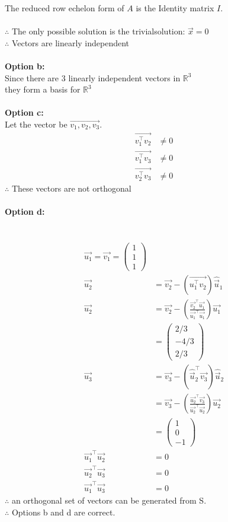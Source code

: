 \documentclass[journal]{IEEEtran}
\begin{document}
The reduced row echelon form of $A$ is the Identity matrix $I$.\\\\
$\therefore$ The only possible solution is the trivialsolution:
$\vec{x}=0$\\
$\therefore$ Vectors are linearly independent\\\\
\textbf{Option b:}\\
Since there are 3 linearly independent vectors in $\mathbb{R}^3$ \\they form a basis for $\mathbb{R}^3$\\\\
\textbf{Option c:}\\
    Let the vector be $\vec{v_1, v_2, v_3}$.
    \begin{align}
    \vec{v_1^\top v_2} &\neq 0 \\
    \vec{v_1^\top v_3 }&\neq 0 \\
    \vec{v_2^\top v_3 }&\neq 0
    \end{align}
    $\therefore$ These vectors are not orthogonal\\\\
\textbf{Option d:}\\
 \\
\\
\begin{align}\vec{u_1} = \vec{v_1} = \begin{pmatrix} 1 \\ 1\\1 \end{pmatrix}\\
\vec{u_2} &= \vec{v_2} - (\vec{u_1^\top v_2}) \hat{\vec{u}}_1 \\
\vec{u_2} &= \vec{v_2} - \left(\frac{\vec{v_2}^\top \vec{u_1}}{\vec{u_1}^\top \vec{u_1}} \right) \vec{u_1}\\ &= \begin{pmatrix} 2/3 \\ -4/3 \\ 2/3 \end{pmatrix} \\
\vec{u_3} &= \vec{v_3} - (\hat{\vec{u}}_2^\top \vec{v_3}) \hat{\vec{u}}_2 \\&= \vec{v_3} - \left( \frac{\vec{u_2}^\top \vec{v_3}}{\vec{u_2}^\top \vec{u_2}} \right) \vec{u_2} \\&= \begin{pmatrix} 1 \\ 0 \\ -1 \end{pmatrix}\\
\vec{u_1}^\top \vec{u_2} &= 0 \\\vec{u_2}^\top \vec{u_3} &= 0 \\\vec{u_1}^\top \vec{u_3} &= 0
\end{align}
$\therefore$ an orthogonal set of vectors can be generated from S.\\
$\therefore$ Options b and d are correct.
\end{document}
